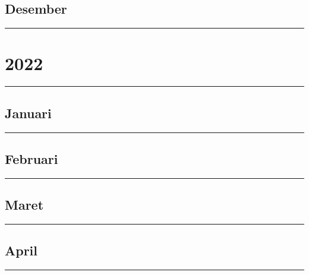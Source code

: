 \documentclass[
]{book}
\begin{document}
\hypertarget{desember}{%
\subsection{Desember}\label{desember}}

\begin{center}\rule{0.5\linewidth}{0.5pt}\end{center}

\hypertarget{section-1}{%
\section{2022}\label{section-1}}

\begin{center}\rule{0.5\linewidth}{0.5pt}\end{center}

\hypertarget{januari}{%
\subsection{Januari}\label{januari}}

\begin{center}\rule{0.5\linewidth}{0.5pt}\end{center}

\hypertarget{februari}{%
\subsection{Februari}\label{februari}}

\begin{center}\rule{0.5\linewidth}{0.5pt}\end{center}

\hypertarget{maret}{%
\subsection{Maret}\label{maret}}

\begin{center}\rule{0.5\linewidth}{0.5pt}\end{center}

\hypertarget{april}{%
\subsection{April}\label{april}}

\begin{center}\rule{0.5\linewidth}{0.5pt}\end{center}
\end{document}
